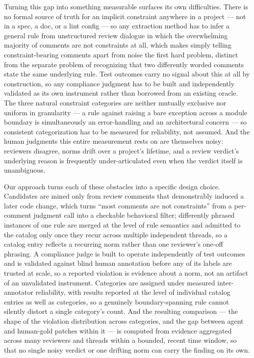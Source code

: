 \documentclass[11pt]{article}
\begin{document}
Turning this gap into something measurable surfaces its own difficulties. There is no formal source of truth for an implicit constraint anywhere in a project --- not in a spec, a doc, or a lint config --- so any extraction method has to infer a general rule from unstructured review dialogue in which the overwhelming majority of comments are not constraints at all, which makes simply telling constraint-bearing comments apart from noise the first hard problem, distinct from the separate problem of recognizing that two differently worded comments state the same underlying rule. Test outcomes carry no signal about this at all by construction, so any compliance judgment has to be built and independently validated as its own instrument rather than borrowed from an existing oracle. The three natural constraint categories are neither mutually exclusive nor uniform in granularity --- a rule against raising a bare exception across a module boundary is simultaneously an error-handling and an architectural concern --- so consistent categorization has to be measured for reliability, not assumed. And the human judgments this entire measurement rests on are themselves noisy: reviewers disagree, norms drift over a project's lifetime, and a review verdict's underlying reason is frequently under-articulated even when the verdict itself is unambiguous.

Our approach turns each of these obstacles into a specific design choice. Candidates are mined only from review comments that demonstrably induced a later code change, which turns ``most comments are not constraints'' from a per-comment judgment call into a checkable behavioral filter; differently phrased instances of one rule are merged at the level of rule semantics and admitted to the catalog only once they recur across multiple independent threads, so a catalog entry reflects a recurring norm rather than one reviewer's one-off phrasing. A compliance judge is built to operate independently of test outcomes and is validated against blind human annotation before any of its labels are trusted at scale, so a reported violation is evidence about a norm, not an artifact of an unvalidated instrument. Categories are assigned under measured inter-annotator reliability, with results reported at the level of individual catalog entries as well as categories, so a genuinely boundary-spanning rule cannot silently distort a single category's count. And the resulting comparison --- the shape of the violation distribution across categories, and the gap between agent and human-gold patches within it --- is computed from evidence aggregated across many reviewers and threads within a bounded, recent time window, so that no single noisy verdict or one drifting norm can carry the finding on its own.
\end{document}
